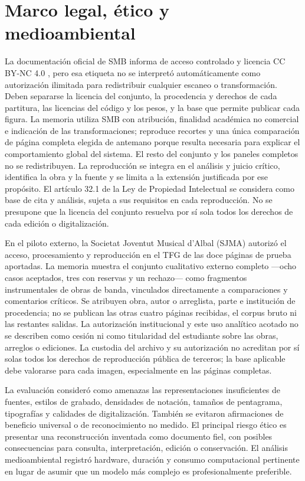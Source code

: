 \section{Marco legal, ético y medioambiental}
La documentación oficial de SMB informa de acceso controlado y licencia CC BY-NC 4.0
\cite{martinez2025smb,smbDatasetCard,ccByNc40}, pero esa etiqueta no se interpretó automáticamente
como autorización ilimitada para redistribuir cualquier escaneo o transformación. Deben separarse
la licencia del conjunto, la procedencia y derechos de cada partitura, las licencias del código y
los pesos, y la base que permite publicar cada figura. La memoria utiliza SMB con atribución,
finalidad académica no comercial e indicación de las transformaciones; reproduce recortes y una
única comparación de página completa elegida de antemano porque resulta necesaria para explicar el
comportamiento global del sistema. El resto del conjunto y los paneles completos no se
redistribuyen. La reproducción se integra en el análisis y juicio crítico, identifica la obra y la
fuente y se limita a la extensión justificada por ese propósito. El artículo 32.1 de la
Ley de Propiedad Intelectual \cite{boeLpiArticle32} se considera como base de cita y análisis,
sujeta a sus requisitos en cada reproducción. No se presupone que la licencia del conjunto
resuelva por sí sola todos los derechos de cada edición o digitalización.

En el piloto externo, la Societat Joventut Musical d'Albal (SJMA) autorizó el acceso, procesamiento
y reproducción en el TFG de las doce páginas de prueba aportadas. La memoria muestra el conjunto
cualitativo externo completo ---ocho casos aceptados, tres con reservas y un rechazo--- como
fragmentos instrumentales de obras de banda, vinculados directamente a comparaciones y comentarios
críticos. Se atribuyen obra, autor
o arreglista, parte e institución de procedencia; no se publican las otras cuatro páginas recibidas,
el corpus bruto ni las restantes salidas. La autorización institucional y este uso analítico
acotado no se describen como cesión ni
como titularidad del estudiante sobre las obras, arreglos o ediciones. La custodia del archivo y
su autorización no acreditan por sí solas todos los derechos de reproducción pública de terceros;
la base aplicable debe valorarse para cada imagen, especialmente en las páginas completas.

La evaluación consideró como amenazas las representaciones insuficientes de fuentes, estilos de grabado,
densidades de notación, tamaños de pentagrama, tipografías y calidades de digitalización. También se
evitaron afirmaciones de beneficio universal o de reconocimiento no medido. El principal riesgo
ético es presentar una reconstrucción inventada como documento fiel, con posibles consecuencias
para consulta, interpretación, edición o conservación. El análisis medioambiental registró
hardware, duración y consumo computacional pertinente en lugar de asumir que un modelo más complejo
es profesionalmente preferible.

